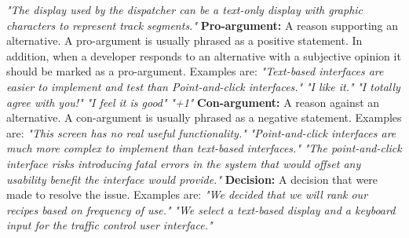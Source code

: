 \documentclass[a4paper,12pt,twoside]{report}
\begin{document}
\begin{appendices}
\textit{"The display used by the dispatcher can be a text-only display with graphic characters to represent track segments."}
\newline \newline
\textbf{Pro-argument:} A reason supporting an alternative. A pro-argument is usually phrased as a positive statement. In addition, when a developer responds to an alternative with a subjective opinion it should be marked as a pro-argument.  Examples are:
\newline \newline
\textit{"Text-based interfaces are easier to implement and test than Point-and-click interfaces."}
\newline \newline
\textit{"I like it."}
\newline \newline
\textit{"I totally agree with you!"}
\newline \newline
\textit{"I feel it is good"}
\newline \newline
\textit{"+1"}
\newline \newline
\textbf{Con-argument:} A reason against an alternative. A con-argument is usually phrased as a negative statement. Examples are:
\newline \newline
\textit{"This screen has no real useful functionality."}
\newline \newline
\textit{"Point-and-click interfaces are much more complex to implement than text-based interfaces."}
\newline \newline
\textit{"The point-and-click interface risks introducing fatal errors in the system that would offset any usability benefit the interface would provide."}
\newline \newline
\textbf{Decision:} A decision that were made to resolve the issue. Examples are:
\newline \newline
\textit{"We decided that we will rank our recipes based on frequency of use."}
\newline \newline 
\textit{"We select a text-based display and a keyboard input for the traffic control user interface."}


\end{appendices}
\end{document}
